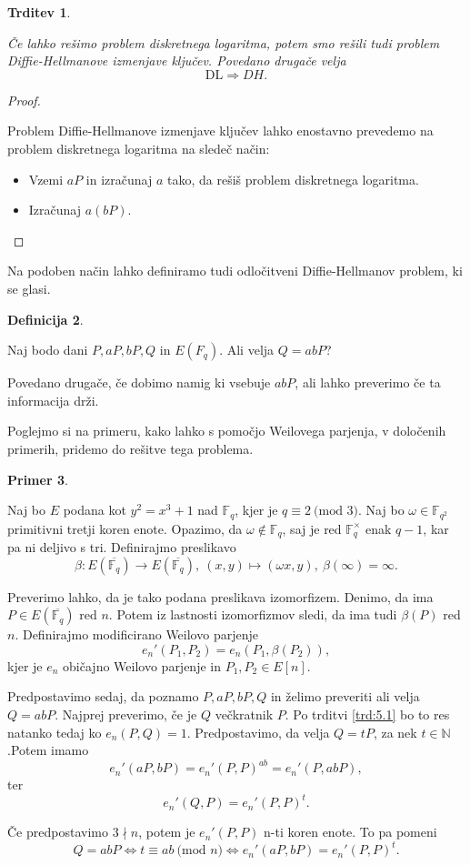 \documentclass[12pt,a4paper,twoside]{article}
\theoremstyle{definition} %
\newtheorem{definicija}{Definicija}[section]
\newtheorem{primer}[definicija]{Primer}
\theoremstyle{plain} %
\newtheorem{trditev}[definicija]{Trditev}
\numberwithin{equation}{section}  %
\newcommand{\N}{\mathbb N}
\newcommand{\F}{\mathbb F}
\newcommand{\E}[1]{E({#1})}
\newcommand{\MOD}[1]{\ \text{(mod }{#1}\text{)}}
\begin{document}
\begin{trditev}~

Če lahko rešimo problem diskretnega logaritma, potem smo rešili tudi problem Diffie-Hellmanove izmenjave ključev. Povedano drugače velja
$$\text{DL} \Rightarrow DH.$$
\end{trditev}

\begin{proof}~

Problem Diffie-Hellmanove izmenjave ključev lahko enostavno prevedemo na problem diskretnega logaritma na sledeč način:

\begin{itemize}
\item Vzemi $aP$ in izračunaj $a$ tako, da rešiš problem diskretnega logaritma.
\item Izračunaj $a(bP)$.
\end{itemize}

\end{proof}

Na podoben način lahko definiramo tudi odločitveni Diffie-Hellmanov problem, ki se glasi.
\begin{definicija}~

Naj bodo dani $P,aP,bP,Q$ in $\E{F_q}$. Ali velja $Q = abP$?
\end{definicija}

Povedano drugače, če dobimo namig ki vsebuje $abP$, ali lahko preverimo če ta informacija drži.

Poglejmo si na primeru, kako lahko s pomočjo Weilovega parjenja, v določenih primerih, pridemo do rešitve tega problema.

\begin{primer}~

Naj bo $E$ podana kot $y^2=x^3+1$ nad $\F_q$, kjer je $q \equiv 2 \MOD{3}$. Naj bo $\omega \in \F_{q^2}$ primitivni tretji koren enote. Opazimo, da $\omega \notin \F_q$, saj je red $\F^{\times}_q$ enak $q-1$, kar pa ni deljivo s tri.
Definirajmo preslikavo
$$\beta:\E{\overline{\F_q}} \rightarrow \E{\overline{\F_q}}, \ (x,y) \mapsto (\omega x,y), \ \beta(\infty) = \infty.$$

Preverimo lahko, da je tako podana preslikava izomorfizem. Denimo, da ima $P \in \E{\overline{\F_q}}$ red $n$. Potem iz lastnosti izomorfizmov sledi, da ima tudi $\beta(P)$ red $n$.
Definirajmo modificirano Weilovo parjenje
$$e_n'(P_1,P_2) = e_n(P_1,\beta(P_2)),$$
kjer je $e_n$ običajno Weilovo parjenje in $P_1,P_2 \in E[n]$.

Predpostavimo sedaj, da poznamo $P,aP,bP,Q$ in želimo preveriti ali velja $Q=abP$. Najprej preverimo, če je $Q$ večkratnik $P$. Po trditvi \ref{trd:5.1} bo to res natanko tedaj ko $e_n(P,Q) = 1$.
Predpostavimo, da velja $Q = tP$, za nek $t \in \N$.Potem imamo
$$e_n'(aP,bP)=e_n'(P,P)^{ab} = e_n'(P,abP),$$
ter
$$e_n'(Q,P) = e_n'(P,P)^t.$$

Če predpostavimo $3 \nmid n$, potem je $e_n'(P,P)$ n-ti koren enote. To pa pomeni
$$Q=abP \iff t \equiv ab \MOD{n} \iff e_n'(aP,bP)=e_n'(P,P)^t.$$
\end{primer}
\end{document}
